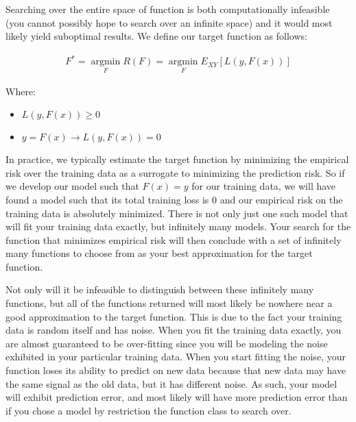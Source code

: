 \documentclass[11pt]{article}
\DeclareMathOperator*{\argmin}{argmin}
\newcommand*{\argminl}{\argmin\limits}
\begin{document}
\vspace{5 mm} 
\noindent 
Searching over the entire space of function is both computationally infeasible 
(you cannot possibly hope to search over an infinite space) and it would most 
likely yield suboptimal results. We define our target function as follows:

\begin{gather*}
F^{*} = \argminl_{F} R(F) = \argminl_{F} E_{XY}[L(y, F(x))]
\end{gather*}

\noindent
Where:

\begin{itemize}
\item $L(y, F(x)) \ge 0$
\item $y = F(x) \rightarrow L(y, F(x)) = 0$
\end{itemize}

\noindent
In practice, we typically estimate the target function by minimizing the
empirical risk over the training data as a surrogate to minimizing the
prediction risk. So if we develop our model such that $F(x) = y$ for our
training data, we will have found a model such that its total training loss is
$0$ and our empirical risk on the training data is absolutely minimized. There 
is not only just one such model that will fit your training data exactly, but
infinitely many models. Your search for the function that minimizes empirical
risk will then conclude with a set of infinitely many functions to choose from
as your best approximation for the target function.

\vspace{5 mm}
\noindent
Not only will it be infeasible to distinguish between these infinitely many
functions, but all of the functions returned will most likely be nowhere near a
good approximation to the target function. This is due to the fact your training
data is random itself and has noise. When you fit the training data exactly, you
are almost guaranteed to be over-fitting since you will be modeling the noise
exhibited in your particular training data. When you start fitting the noise,
your function loses its ability to predict on new data because that new data may
have the same signal as the old data, but it has different noise. As such, your 
model will exhibit prediction error, and most likely will have more prediction 
error than if you chose a model by restriction the function class to search 
over.

\newpage
\begin{center}
\ \\
\end{center}
\end{document}
